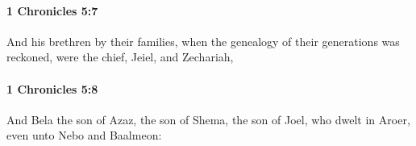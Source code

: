 		\paragraph{1 Chronicles 5:7} %
			\label{1CHRONICLES-5-7}

			And his brethren by their families, when the genealogy of their generations was reckoned, were the chief, Jeiel, and Zechariah,


		\paragraph{1 Chronicles 5:8} %
			\label{1CHRONICLES-5-8}

			And Bela the son of Azaz, the son of Shema, the son of Joel, who dwelt in Aroer, even unto Nebo and Baalmeon:


